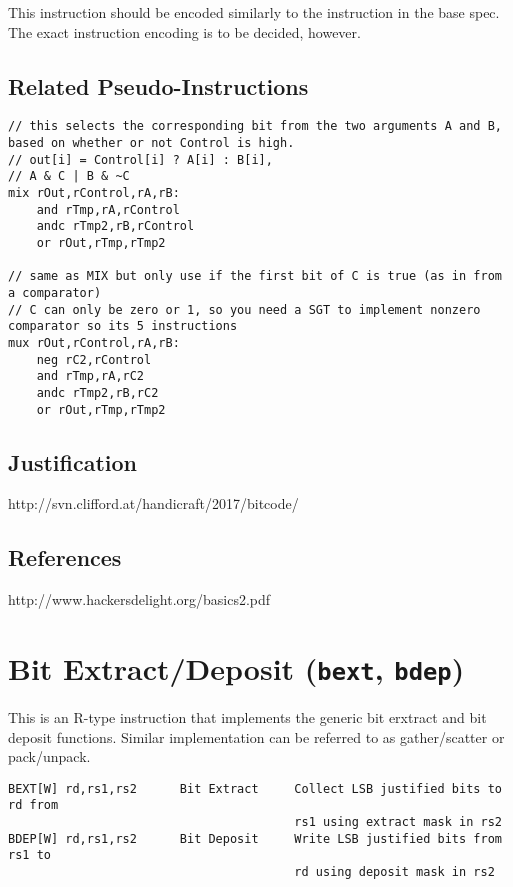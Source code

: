 This instruction should be encoded similarly to the instruction in the
base spec. The exact instruction encoding is to be decided, however.

\subsection{Related Pseudo-Instructions}

\begin{verbatim}
// this selects the corresponding bit from the two arguments A and B, based on whether or not Control is high.
// out[i] = Control[i] ? A[i] : B[i],
// A & C | B & ~C
mix rOut,rControl,rA,rB:
    and rTmp,rA,rControl
    andc rTmp2,rB,rControl
    or rOut,rTmp,rTmp2

// same as MIX but only use if the first bit of C is true (as in from a comparator)
// C can only be zero or 1, so you need a SGT to implement nonzero comparator so its 5 instructions
mux rOut,rControl,rA,rB:
    neg rC2,rControl
    and rTmp,rA,rC2
    andc rTmp2,rB,rC2
    or rOut,rTmp,rTmp2
\end{verbatim}

\subsection{Justification}

http://svn.clifford.at/handicraft/2017/bitcode/

\subsection{References}

http://www.hackersdelight.org/basics2.pdf


\section{Bit Extract/Deposit (\texttt{bext}, \texttt{bdep})}

This is an R-type instruction that implements the generic bit erxtract
and bit deposit functions. Similar implementation can be referred to as
gather/scatter or pack/unpack.

\begin{verbatim}
BEXT[W] rd,rs1,rs2      Bit Extract     Collect LSB justified bits to rd from
                                        rs1 using extract mask in rs2
BDEP[W] rd,rs1,rs2      Bit Deposit     Write LSB justified bits from rs1 to
                                        rd using deposit mask in rs2
\end{verbatim}

